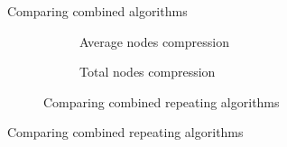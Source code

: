 \begin{table}[hbt]
  \centering
  \caption{Comparing combined algorithms}
\end{table}
\begin{figure}[hbt]
  \begin{subfigure}{0.5\textwidth}
    \centering
    \caption{Average nodes compression}
  \end{subfigure}
  \begin{subfigure}{0.5\textwidth}
    \centering
    \caption{Total nodes compression}
  \end{subfigure}
  \caption{Comparing combined repeating algorithms}
\end{figure}
\begin{table}[hbt]
  \centering
  \caption{Comparing combined repeating algorithms}
\end{table}
